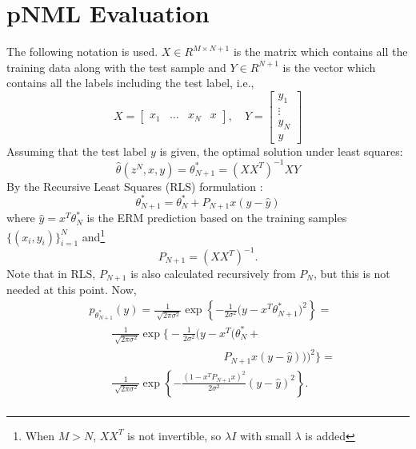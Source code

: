 \documentclass[conference,letterpaper]{IEEEtran}
\begin{document}
\section{pNML Evaluation} \label{sec:pNML_eval}
The following notation is used. 
$X \in R^{M \times N+1}$ is the matrix which contains all the training data along with the test sample and $Y \in R^{N+1}$ is the vector which contains all the labels including the test label, i.e.,
\begin{equation}
X = \begin{bmatrix} x_1 & \dots & x_N & x \end{bmatrix}, \;\;\ \ 
Y = \begin{bmatrix} y_1 \\ \vdots \\ y_N \\ y \end{bmatrix}
\end{equation}
Assuming that the test label $y$ is given, the optimal solution under least squares:
\begin{equation}
\hat{\theta}(z^N,x,y) = \theta^*_{N+1} = (X X^T)^{-1} X Y
\end{equation}
By the Recursive Least Squares (RLS) formulation \cite{hayes19969}:
\begin{equation} \label{eq:rls_update}
\theta ^*_{N+1} = \theta^*_{N} + P_{N+1} x (y - \hat{y})
\end{equation}
where $\hat{y} = x^T \theta ^*_{N}$ is the ERM prediction based on the training samples $\{(x_i, y_i)\}_{i=1}^{N}$ and\footnote{When $M > N$, $XX^T$ is not invertible, so $\lambda I$ with small $\lambda$ is added}
\begin{equation}
P_{N+1} = (XX^T)^{-1}. 
\end{equation}
Note that in RLS, $P_{N+1}$ is also calculated recursively from $P_N$, but this is not needed at this point.
Now,
\begin{equation}
\begin{split}
&p_{\theta_{N+1}^*}(y) 
=\frac{1}{\sqrt[]{2\pi\sigma^2}}\exp\left\{-\frac{1}{2\sigma^2}\big(y- x^T\theta_{N+1}^* \big)^2\right\} = \\
& \qquad \frac{1}{\sqrt[]{2\pi\sigma^2}}\exp\bigg\{-\frac{1}{2\sigma^2}\big(y - x^T \big(\theta^*_{N} + \\ 
& \qquad \qquad \qquad \qquad \qquad \qquad P_{N+1} x (y -\hat{y}) \big) \big)^2\bigg\} = \\
& \qquad \frac{1}{\sqrt[]{2\pi\sigma^2}}
\exp\left\{-\frac{(1 - x^T P_{N+1} x )^2 }{2\sigma^2}\left(y-\hat{y} \right)^2\right\}.  \\
\end{split}
\end{equation}
\end{document}
